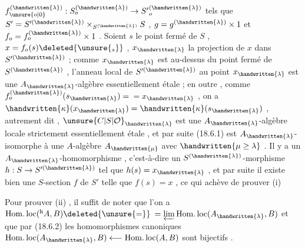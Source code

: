 $f_{\unsure{o|0}}^{(\handwritten{\lambda})}:S_o^{(\handwritten{\lambda})}\to {S'}_o^{(\handwritten{\lambda})}$ tels que $S'=S'^{(\handwritten{\lambda})}\times_{S^{(\handwritten{\lambda})}}S$ , $g=g^{(\handwritten{\lambda})}\times 1$ et $f_o=f_o^{(\handwritten{\lambda})}\times 1$ . 
Soient $s$ le point fermé de $S$ , $x=f_o(s)\deleted{\unsure{{}_s}}$ , $x_{\handwritten{\lambda}}$ la projection de $x$ dans $S'^{(\handwritten{\lambda})}$ ;
comme $x_{\handwritten{\lambda}}$ est au-dessus du point fermé de $S^{(\handwritten{\lambda})}$ , l'anneau local  de $S'^{(\handwritten{\lambda})}$ au
point $x_{\handwritten{\lambda}}$ est une $A_{\handwritten{\lambda}}$-algèbre essentiellement étale ; en outre , comme $f_o^{(\handwritten{\lambda})}(s_{\handwritten{\lambda}})=$
$=x_{\handwritten{\lambda}}$ , on a $\handwritten{\kappa}(x_{\handwritten{\lambda}})=\handwritten{\kappa}(s_{\handwritten{\lambda}})$ , autrement dit , $\unsure{C|S|\mathcal{O}}_{\handwritten{\lambda}}$ est une $A_{\handwritten{\lambda}}$-algèbre locale strictement
essentiellement étale , et par suite (18.6.1) est $A_{\handwritten{\lambda}}$-isomorphe à une
$A$-algèbre $A_{\handwritten{\mu}}$ avec $\handwritten{\mu\geq\lambda}$ . Il y a   un $A_{\handwritten{\lambda}}$-homomorphisme   , c'est-à-dire
un $S^{(\handwritten{\lambda})}$-morphisme $h:S\to S'^{(\handwritten{\lambda})}$ tel que $h(s)=x_{\handwritten{\lambda}}$ , et par suite il existe
bien une $S$-section $f$ de $S'$ telle que $f(s)=x$ , ce qui achève de prouver (i) 

Pour prouver (ii) , il suffit de noter que l'on a $\operatorname{Hom.loc}({}^{\mathrm h}A,B)\deleted{\unsure{=}}$
\margin{\handwritten{$\simeq$}}
$=\varprojlim\operatorname{Hom.loc}(A_{\handwritten{\lambda}},B)$ et que par (18.6.2) les homomorphismes canoniques
$\operatorname{Hom.loc}(A_{\handwritten{\lambda}},B)\longleftarrow\operatorname{Hom.loc}(A,B)$ sont bijectifs .

